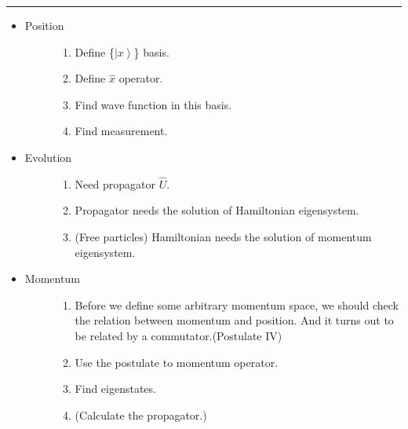 \documentclass[letterpaper,10pt,english]{sphinxmanual}
\newcommand{\ket}[1]{\left| #1\right\rangle}
\begin{document}
\bigskip\hrule{}\bigskip

\begin{itemize}
\item {} \begin{description}
\item[{Position}] \leavevmode\begin{enumerate}
\item {} 
Define \{\(\ket{x}\)\} basis.

\item {} 
Define \(\hat x\) operator.

\item {} 
Find wave function in this basis.

\item {} 
Find measurement.

\end{enumerate}

\end{description}

\item {} \begin{description}
\item[{Evolution}] \leavevmode\begin{enumerate}
\item {} 
Need propagator \(\hat U\).

\item {} 
Propagator needs the solution of Hamiltonian eigensystem.

\item {} 
(Free particles) Hamiltonian needs the solution of momentum eigensystem.

\end{enumerate}

\end{description}

\item {} \begin{description}
\item[{Momentum}] \leavevmode\begin{enumerate}
\item {} 
Before we define some arbitrary momentum space, we should check the relation between momentum and position. And it turns out to be related by a commutator.(Postulate IV)

\item {} 
Use the postulate to momentum operator.

\item {} 
Find eigenstates.

\item {} 
(Calculate the propagator.)

\end{enumerate}

\end{description}

\end{itemize}
\end{document}

